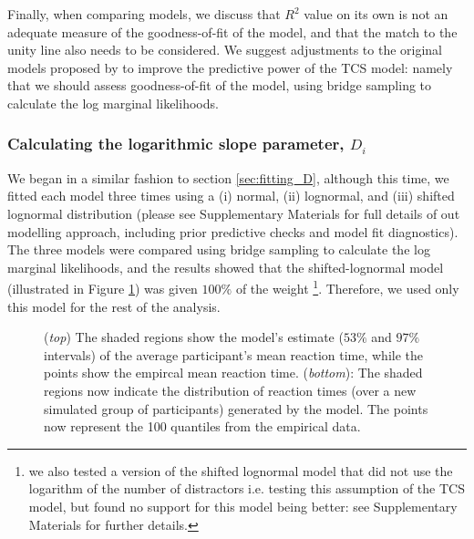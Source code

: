 \documentclass[smallextended, natbib]{svjour3}       %
\begin{document}
Finally, when comparing models, we discuss that $R^2$ value on its own is not an adequate measure of the goodness-of-fit of the model, and that the match to the unity line also needs to be considered. We suggest adjustments to the original models proposed by \citep{buetti2019predicting} to improve the predictive power of the TCS model: namely that we should assess goodness-of-fit of the model, using bridge sampling to calculate the log marginal likelihoods.

\subsubsection{Calculating the logarithmic slope parameter, $D_i$}

We began in a similar fashion to section \ref{sec:fitting_D}, although this time, we fitted each model three times using a (i) normal, (ii) lognormal, and (iii) shifted lognormal distribution (please see Supplementary Materials for full details of out modelling approach, including prior predictive checks and model fit diagnostics). The three models were compared using bridge sampling to calculate the log marginal likelihoods, and the results showed that the shifted-lognormal model (illustrated in Figure \ref{fig:buetti2019_a1}) was given $100\%$ of the weight \footnote{we also tested a version of the shifted lognormal model that did not use the logarithm of the number of distractors i.e. testing this assumption of the TCS model, but found no support for this model being better: see Supplementary Materials for further details.}. Therefore, we used only this model for the rest of the analysis. 

\begin{figure}
\centering
{}
\caption{(\textit{top}) The shaded regions show the model's estimate ($53\%$ and $97\%$ intervals) of the average participant's mean reaction time, while the points show the empircal mean reaction time. (\textit{bottom}): The shaded regions now indicate the distribution of reaction times (over a new simulated group of participants) generated by the model. The points now represent the 100 quantiles from the empirical data.}
\label{fig:buetti2019_a1}
\end{figure}
\end{document}
